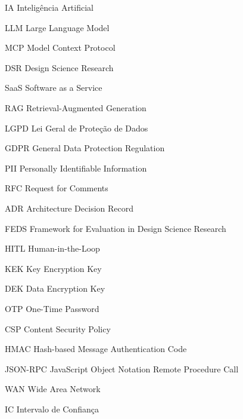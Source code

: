 \begin{siglas}
\item[IA] Inteligência Artificial
\item[LLM] Large Language Model
\item[MCP] Model Context Protocol
\item[DSR] Design Science Research
\item[SaaS] Software as a Service
\item[RAG] Retrieval-Augmented Generation
\item[LGPD] Lei Geral de Proteção de Dados
\item[GDPR] General Data Protection Regulation
\item[PII] Personally Identifiable Information
\item[RFC] Request for Comments
\item[ADR] Architecture Decision Record
\item[FEDS] Framework for Evaluation in Design Science Research
\item[HITL] Human-in-the-Loop
\item[KEK] Key Encryption Key
\item[DEK] Data Encryption Key
\item[OTP] One-Time Password
\item[CSP] Content Security Policy
\item[HMAC] Hash-based Message Authentication Code
\item[JSON-RPC] JavaScript Object Notation Remote Procedure Call
\item[WAN] Wide Area Network
\item[IC] Intervalo de Confiança
\end{siglas}
\tableofcontents*
